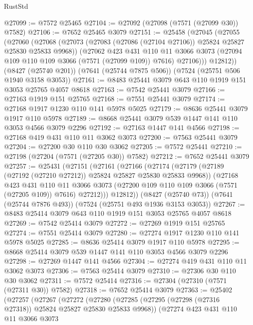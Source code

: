 \begin{lexlean}{RustStd}
\begin{coremodule}
{\begin{coremodule}
{{{{{{{{{{{{{{{{{{{{{{{{{{{{{{{{@27099 := @7572 @25465
@27104 := @27092 (@27098 (@7571 (@27099 @30)) @7582)
@27106 := @7652 @25465 @3079
@27151 := @25458
    (@27045
      (@27055
        (@27060
          (@27068
            (@27073 (@27083 (@27086 (@27104 @27106)) @25824 @25827 @25830 @25833 @9968))
            (@27062
              @423
              @431
              @110
              @11
              @3066
              @3073
              (@27094 @109 @110 @109 @3066 (@7571 (@27099 @109)) @7616)
              @27106)))
        @12812))
    (@8427 (@25740 @201))
    (@7641 (@25744 @7875 @506))
    (@7524 (@25751 @506 @1940 @3158 @3053))
@27161 := @8483 @25441 @3079 @643 @110 @1919 @151 @3053 @25765 @4057 @8618
@27163 := @7542 @25441 @3079
@27166 := @27163 @1919 @151 @25765
@27168 := @7551 @25441 @3079
@27174 := @27168 @1917 @1230 @110 @141 @5978 @5025
@27179 := @8636 @25441 @3079 @1917 @110 @5978
@27189 := @8668 @25441 @3079 @539 @1447 @141 @110 @3053 @4566 @3079 @2296
@27192 := @27163 @1447 @141 @4566
@27198 := @27168 @419 @431 @110 @11 @3062 @3073
@27200 := @7563 @25441 @3079
@27204 := @27200 @30 @110 @30 @3062
@27205 := @7572 @25441
@27210 := @27198 (@27204 (@7571 (@27205 @30)) @7582)
@27212 := @7652 @25441 @3079
@27257 := @25431
    (@27151
      (@27161
        (@27166
          (@27174
            (@27179 (@27189 (@27192 (@27210 @27212)) @25824 @25827 @25830 @25833 @9968))
            (@27168
              @423
              @431
              @110
              @11
              @3066
              @3073
              (@27200 @109 @110 @109 @3066 (@7571 (@27205 @109)) @7616)
              @27212)))
        @12812))
    (@8427 (@25740 @73))
    (@7641 (@25744 @7876 @493))
    (@7524 (@25751 @493 @1936 @3153 @3053))
@27267 := @8483 @25414 @3079 @643 @110 @1919 @151 @3053 @25765 @4057 @8618
@27269 := @7542 @25414 @3079
@27272 := @27269 @1919 @151 @25765
@27274 := @7551 @25414 @3079
@27280 := @27274 @1917 @1230 @110 @141 @5978 @5025
@27285 := @8636 @25414 @3079 @1917 @110 @5978
@27295 := @8668 @25414 @3079 @539 @1447 @141 @110 @3053 @4566 @3079 @2296
@27298 := @27269 @1447 @141 @4566
@27304 := @27274 @419 @431 @110 @11 @3062 @3073
@27306 := @7563 @25414 @3079
@27310 := @27306 @30 @110 @30 @3062
@27311 := @7572 @25414
@27316 := @27304 (@27310 (@7571 (@27311 @30)) @7582)
@27318 := @7652 @25414 @3079
@27363 := @25402
    (@27257
      (@27267
        (@27272
          (@27280
            (@27285 (@27295 (@27298 (@27316 @27318)) @25824 @25827 @25830 @25833 @9968))
            (@27274
              @423
              @431
              @110
              @11
              @3066
              @3073
}}}}}}}}}}}}}}}}}}}}}}}}}}}}}}}}
\end{coremodule}}
\end{coremodule}
\end{lexlean}

